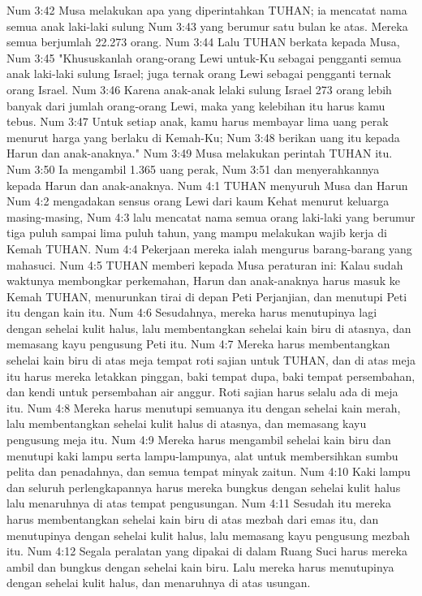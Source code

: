 Num 3:42  Musa melakukan apa yang diperintahkan TUHAN; ia mencatat nama semua anak laki-laki sulung
Num 3:43  yang berumur satu bulan ke atas. Mereka semua berjumlah 22.273 orang.
Num 3:44  Lalu TUHAN berkata kepada Musa,
Num 3:45  "Khususkanlah orang-orang Lewi untuk-Ku sebagai pengganti semua anak laki-laki sulung Israel; juga ternak orang Lewi sebagai pengganti ternak orang Israel.
Num 3:46  Karena anak-anak lelaki sulung Israel 273 orang lebih banyak dari jumlah orang-orang Lewi, maka yang kelebihan itu harus kamu tebus.
Num 3:47  Untuk setiap anak, kamu harus membayar lima uang perak menurut harga yang berlaku di Kemah-Ku;
Num 3:48  berikan uang itu kepada Harun dan anak-anaknya."
Num 3:49  Musa melakukan perintah TUHAN itu.
Num 3:50  Ia mengambil 1.365 uang perak,
Num 3:51  dan menyerahkannya kepada Harun dan anak-anaknya.
Num 4:1  TUHAN menyuruh Musa dan Harun
Num 4:2  mengadakan sensus orang Lewi dari kaum Kehat menurut keluarga masing-masing,
Num 4:3  lalu mencatat nama semua orang laki-laki yang berumur tiga puluh sampai lima puluh tahun, yang mampu melakukan wajib kerja di Kemah TUHAN.
Num 4:4  Pekerjaan mereka ialah mengurus barang-barang yang mahasuci.
Num 4:5  TUHAN memberi kepada Musa peraturan ini: Kalau sudah waktunya membongkar perkemahan, Harun dan anak-anaknya harus masuk ke Kemah TUHAN, menurunkan tirai di depan Peti Perjanjian, dan menutupi Peti itu dengan kain itu.
Num 4:6  Sesudahnya, mereka harus menutupinya lagi dengan sehelai kulit halus, lalu membentangkan sehelai kain biru di atasnya, dan memasang kayu pengusung Peti itu.
Num 4:7  Mereka harus membentangkan sehelai kain biru di atas meja tempat roti sajian untuk TUHAN, dan di atas meja itu harus mereka letakkan pinggan, baki tempat dupa, baki tempat persembahan, dan kendi untuk persembahan air anggur. Roti sajian harus selalu ada di meja itu.
Num 4:8  Mereka harus menutupi semuanya itu dengan sehelai kain merah, lalu membentangkan sehelai kulit halus di atasnya, dan memasang kayu pengusung meja itu.
Num 4:9  Mereka harus mengambil sehelai kain biru dan menutupi kaki lampu serta lampu-lampunya, alat untuk membersihkan sumbu pelita dan penadahnya, dan semua tempat minyak zaitun.
Num 4:10  Kaki lampu dan seluruh perlengkapannya harus mereka bungkus dengan sehelai kulit halus lalu menaruhnya di atas tempat pengusungan.
Num 4:11  Sesudah itu mereka harus membentangkan sehelai kain biru di atas mezbah dari emas itu, dan menutupinya dengan sehelai kulit halus, lalu memasang kayu pengusung mezbah itu.
Num 4:12  Segala peralatan yang dipakai di dalam Ruang Suci harus mereka ambil dan bungkus dengan sehelai kain biru. Lalu mereka harus menutupinya dengan sehelai kulit halus, dan menaruhnya di atas usungan.

